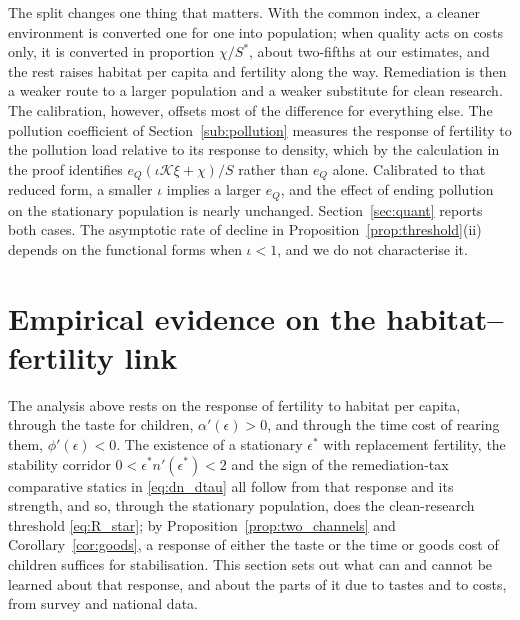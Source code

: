 \documentclass[11pt]{article}
\begin{document}
The split changes one thing that matters. With the common index, a cleaner environment is converted
one for one into population; when quality acts on costs only, it is converted in proportion
$\chi/S^\ast$, about two-fifths at our estimates, and the rest raises habitat per capita and fertility
along the way. Remediation is then a weaker route to a larger population and a weaker substitute for clean
research. The calibration, however, offsets most of the difference for everything else. The pollution
coefficient of Section~\ref{sub:pollution} measures the response of fertility to the pollution load
relative to its response to density, which by the calculation in the proof identifies
$e_Q(\iota\mathcal{K}\xi+\chi)/S$ rather than $e_Q$ alone. Calibrated to that reduced form, a smaller
$\iota$ implies a larger $e_Q$, and the effect of ending pollution on the stationary population is
nearly unchanged. Section~\ref{sec:quant} reports both cases. The asymptotic rate of decline in
Proposition~\ref{prop:threshold}(ii) depends on the functional forms when $\iota<1$, and we do not
characterise it.

\section{Empirical evidence on the habitat--fertility link}
\label{sec:empirics}

The analysis above rests on the response of fertility to habitat per capita, through the taste for
children, $\alpha'(\epsilon)>0$, and through the time cost of rearing them, $\phi'(\epsilon)<0$. The existence of a stationary $\epsilon^\ast$ with replacement fertility, the stability
corridor $0<\epsilon^\ast n'(\epsilon^\ast)<2$ and the sign of the remediation-tax comparative
statics in \eqref{eq:dn_dtau} all follow from that response and its strength, and so, through the
stationary population, does the clean-research threshold \eqref{eq:R_star}; by
Proposition~\ref{prop:two_channels} and Corollary~\ref{cor:goods}, a response of either the taste or the time or goods cost of children suffices for stabilisation. This section sets out what can and cannot be learned about
that response, and about the parts of it due to tastes and to costs, from survey and national data.
\end{document}
